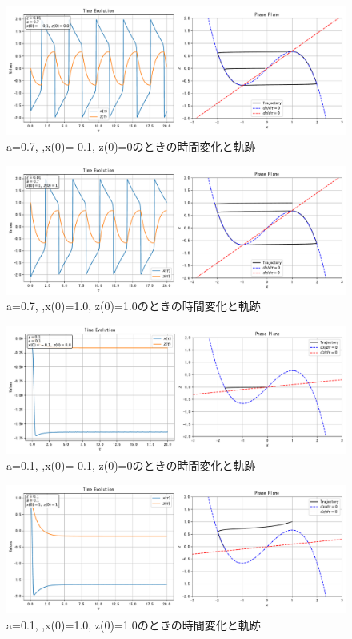 \documentclass[11pt]{ltjsarticle}
\begin{document}
        \begin{figure}[H]
          \centering
          \includegraphics[width=0.98\columnwidth]{plot_3.pdf}
          \caption{a=0.7, ,x(0)=-0.1, z(0)=0のときの時間変化と軌跡}
        \end{figure}
        \begin{figure}[H]
          \centering
          \includegraphics[width=0.98\columnwidth]{plot_4.pdf}
          \caption{a=0.7, ,x(0)=1.0, z(0)=1.0のときの時間変化と軌跡}
        \end{figure}
        \begin{figure}[H]
          \centering
          \includegraphics[width=0.98\columnwidth]{plot_5.pdf}
          \caption{a=0.1, ,x(0)=-0.1, z(0)=0のときの時間変化と軌跡}
        \end{figure}
        \begin{figure}[H]
          \centering
          \includegraphics[width=0.98\columnwidth]{plot_6.pdf}
          \caption{a=0.1, ,x(0)=1.0, z(0)=1.0のときの時間変化と軌跡}
        \end{figure} 
\end{document}
